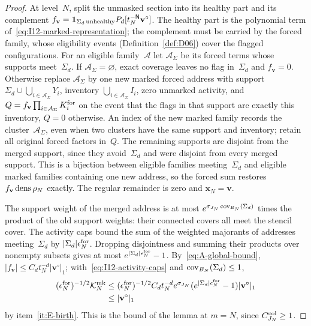 \begin{proof}
At level~$N$, split the unmasked section into its healthy part and its complement $f_{\mathbf v}=\mathbf1_{\Sigma_d\,\mathrm{unhealthy}}P_d[t_N^{-\mathsf{N}}\mathbf v^\circ]$. The healthy part is the polynomial term of~\eqref{eq:I12-marked-representation}; the complement must be carried by the forced family, whose eligibility events (Definition~\ref{def:D06}) cover the flagged configurations. For an eligible family~$\mathcal A$ let $\mathcal A_\Sigma$ be its forced terms whose supports meet~$\Sigma_d$. If $\mathcal A_\Sigma=\varnothing$, exact coverage leaves no flag in~$\Sigma_d$ and $f_{\mathbf v}=0$. Otherwise replace $\mathcal A_\Sigma$ by one new marked forced address with support $\Sigma_d\cup\bigcup_{i\in\mathcal A_\Sigma}Y_i$, inventory $\bigcup_{i\in\mathcal A_\Sigma}I_i$, zero unmarked activity, and $Q=f_{\mathbf v}\prod_{i\in\mathcal A_\Sigma}K_i^{\rm for}$ on the event that the flags in that support are exactly this inventory, $Q=0$ otherwise. An index of the new marked family records the cluster~$\mathcal A_\Sigma$, even when two clusters have the same support and inventory; retain all original forced factors in~$Q$. The remaining supports are disjoint from the merged support, since they avoid~$\Sigma_d$ and were disjoint from every merged support. This is a bijection between eligible families meeting~$\Sigma_d$ and eligible marked families containing one new address, so the forced sum restores $f_{\mathbf v}\operatorname{dens}\rho_N$ exactly. The regular remainder is zero and $\mathbf x_N=\mathbf v$.

The support weight of the merged address is at most $e^{\sigma_{J_N}\operatorname{cov}_{B_N}(\Sigma_d)}$ times the product of the old support weights: their connected covers all meet the stencil cover. The activity caps bound the sum of the weighted majorants of addresses meeting~$\Sigma_d$ by $|\Sigma_d|\epsilon_N^{\rm for}$. Dropping disjointness and summing their products over nonempty subsets gives at most $e^{|\Sigma_d|\epsilon_N^{\rm for}}-1$. By~\eqref{eq:A-global-bound}, $|f_{\mathbf v}|\le C_dt_N^{-d}|\mathbf v^\circ|_1$; with~\eqref{eq:I12-activity-caps} and $\operatorname{cov}_{B_N}(\Sigma_d)\le1$,
\begin{equation*}
\begin{aligned}
 (\epsilon_N^{\rm for})^{-1/2}\mathcal K^{\rm mk}_N
 &\le(\epsilon_N^{\rm for})^{-1/2}C_dt_N^{-d}e^{\sigma_{J_N}}
 (e^{|\Sigma_d|\epsilon_N^{\rm for}}-1)|\mathbf v^\circ|_1\\
 &\le|\mathbf v^\circ|_1
\end{aligned}
\end{equation*}
by item~\ref{it:E-birth}. This is the bound of the lemma at $m=N$, since $C^{\rm col}_{J_N}\ge1$.


\end{proof}
